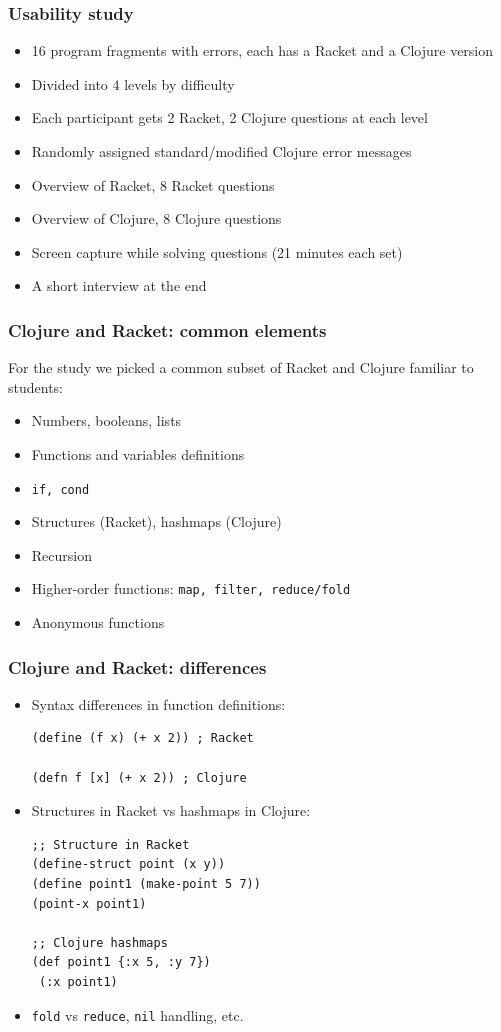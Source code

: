\documentclass{beamer}
\newcommand{\comment}[1]{{\bf \tt  {#1}}}
\newcommand{\emcomment}[1]{\textcolor{ForestGreen}{\comment{Elena: {#1}}}}
\begin{document}
\begin{frame}
\frametitle{Usability study}
\begin{itemize}
\item 16 program fragments with errors, each has a Racket and a Clojure version 
\item Divided into 4 levels by difficulty
\item Each participant gets 2 Racket, 2 Clojure questions at each level
\item Randomly assigned standard/modified Clojure error messages
\item Overview of Racket, 8 Racket questions 
\item Overview of Clojure, 8 Clojure questions
\item Screen capture while solving questions (21 minutes each set)
\item A short interview at the end
\end{itemize}
\end{frame}

\begin{frame}
\frametitle{ Clojure and Racket: common elements}
For the study we picked a common subset of Racket and Clojure familiar to students:
\begin{itemize}
\item Numbers, booleans, lists
\item Functions and variables definitions
\item {\tt if, cond}
\item Structures (Racket), hashmaps (Clojure)
\item Recursion
\item Higher-order functions: {\tt map, filter, reduce/fold}
\item Anonymous functions
\end{itemize}
\end{frame}

\begin{frame}[fragile]
\frametitle{ Clojure and Racket:  differences}
\begin{itemize}
\item Syntax differences in function definitions:
\begin{verbatim}
(define (f x) (+ x 2)) ; Racket

(defn f [x] (+ x 2)) ; Clojure
\end{verbatim}
\item Structures in Racket vs hashmaps in Clojure:
\begin{verbatim}
;; Structure in Racket
(define-struct point (x y))
(define point1 (make-point 5 7))
(point-x point1)

;; Clojure hashmaps
(def point1 {:x 5, :y 7})
 (:x point1)
\end{verbatim}
\item {\tt fold} vs {\tt reduce}, {\tt nil} handling, etc. 
\end{itemize}
\end{frame}
\end{document}
